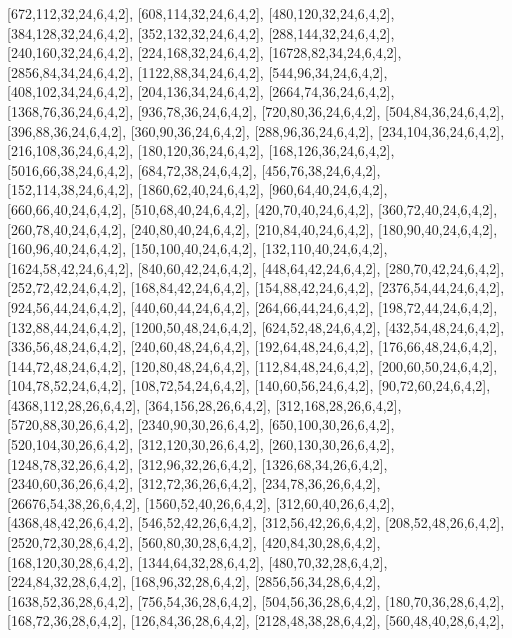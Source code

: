 \documentclass[12pt]{amsart}
\begin{document}
[672,112,32,24,6,4,2],   [608,114,32,24,6,4,2],   [480,120,32,24,6,4,2],   [384,128,32,24,6,4,2],   [352,132,32,24,6,4,2],   [288,144,32,24,6,4,2],
[240,160,32,24,6,4,2],   [224,168,32,24,6,4,2],   [16728,82,34,24,6,4,2],   [2856,84,34,24,6,4,2],   [1122,88,34,24,6,4,2],   [544,96,34,24,6,4,2],
[408,102,34,24,6,4,2],   [204,136,34,24,6,4,2],   [2664,74,36,24,6,4,2],   [1368,76,36,24,6,4,2],   [936,78,36,24,6,4,2],   [720,80,36,24,6,4,2],   [504,84,36,24,6,4,2],
[396,88,36,24,6,4,2],   [360,90,36,24,6,4,2],   [288,96,36,24,6,4,2],   [234,104,36,24,6,4,2],   [216,108,36,24,6,4,2],   [180,120,36,24,6,4,2],   [168,126,36,24,6,4,2],
[5016,66,38,24,6,4,2],   [684,72,38,24,6,4,2],   [456,76,38,24,6,4,2],   [152,114,38,24,6,4,2],   [1860,62,40,24,6,4,2],   [960,64,40,24,6,4,2],   [660,66,40,24,6,4,2],
[510,68,40,24,6,4,2],   [420,70,40,24,6,4,2],   [360,72,40,24,6,4,2],   [260,78,40,24,6,4,2],   [240,80,40,24,6,4,2],   [210,84,40,24,6,4,2],   [180,90,40,24,6,4,2],
[160,96,40,24,6,4,2],   [150,100,40,24,6,4,2],   [132,110,40,24,6,4,2],   [1624,58,42,24,6,4,2],   [840,60,42,24,6,4,2],   [448,64,42,24,6,4,2],   [280,70,42,24,6,4,2],
[252,72,42,24,6,4,2],   [168,84,42,24,6,4,2],   [154,88,42,24,6,4,2],   [2376,54,44,24,6,4,2],   [924,56,44,24,6,4,2],   [440,60,44,24,6,4,2],   [264,66,44,24,6,4,2],
[198,72,44,24,6,4,2],   [132,88,44,24,6,4,2],   [1200,50,48,24,6,4,2],   [624,52,48,24,6,4,2],   [432,54,48,24,6,4,2],   [336,56,48,24,6,4,2],   [240,60,48,24,6,4,2],
[192,64,48,24,6,4,2],   [176,66,48,24,6,4,2],   [144,72,48,24,6,4,2],   [120,80,48,24,6,4,2],   [112,84,48,24,6,4,2],   [200,60,50,24,6,4,2],   [104,78,52,24,6,4,2],
[108,72,54,24,6,4,2],   [140,60,56,24,6,4,2],   [90,72,60,24,6,4,2],   [4368,112,28,26,6,4,2],   [364,156,28,26,6,4,2],   [312,168,28,26,6,4,2],   [5720,88,30,26,6,4,2],
[2340,90,30,26,6,4,2],   [650,100,30,26,6,4,2],   [520,104,30,26,6,4,2],   [312,120,30,26,6,4,2],   [260,130,30,26,6,4,2],   [1248,78,32,26,6,4,2],   [312,96,32,26,6,4,2],
[1326,68,34,26,6,4,2],   [2340,60,36,26,6,4,2],   [312,72,36,26,6,4,2],   [234,78,36,26,6,4,2],   [26676,54,38,26,6,4,2],   [1560,52,40,26,6,4,2],   [312,60,40,26,6,4,2],
[4368,48,42,26,6,4,2],   [546,52,42,26,6,4,2],   [312,56,42,26,6,4,2],   [208,52,48,26,6,4,2],   [2520,72,30,28,6,4,2],   [560,80,30,28,6,4,2],   [420,84,30,28,6,4,2],
[168,120,30,28,6,4,2],   [1344,64,32,28,6,4,2],   [480,70,32,28,6,4,2],   [224,84,32,28,6,4,2],   [168,96,32,28,6,4,2],   [2856,56,34,28,6,4,2],   [1638,52,36,28,6,4,2],
[756,54,36,28,6,4,2],   [504,56,36,28,6,4,2],   [180,70,36,28,6,4,2],   [168,72,36,28,6,4,2],   [126,84,36,28,6,4,2],   [2128,48,38,28,6,4,2],   [560,48,40,28,6,4,2],
\end{document}
